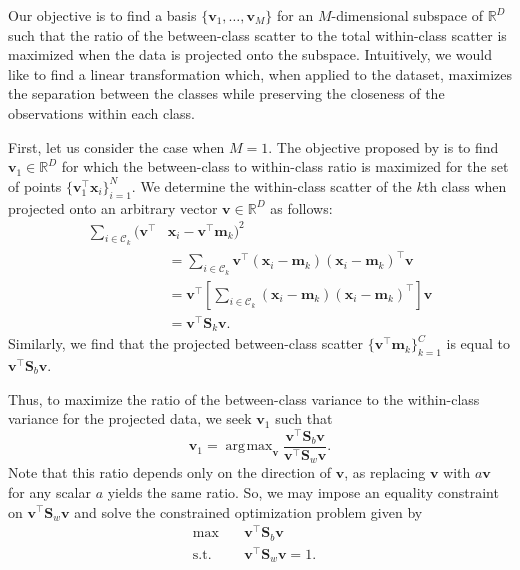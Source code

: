 \documentclass[letterpaper, 10 pt, conference]{ieeeconf}  %
\DeclareMathOperator*{\argmax}{\arg\!\max}
\newcommand{\ve}[1]{\mathbf{#1}}
\begin{document}
Our objective is to find a basis $\{\ve{v}_1,\ldots,\ve{v}_M\}$ for an $M$-dimensional subspace of $\mathbb{R}^D$ such that the ratio of the between-class scatter to the total within-class scatter is maximized when the data is projected onto the subspace. Intuitively, we would like to find a linear transformation which, when applied to the dataset, maximizes the separation between the classes while preserving the closeness of the observations within each class.

First, let us consider the case when $M = 1$. The objective proposed by \citeauthor{fisher} is to find $\ve{v}_1 \in \mathbb{R}^D$ for which the between-class to within-class ratio is maximized for the set of points $\{\ve{v}_1^{\top}\ve{x}_i\}_{i=1}^N$. We determine the within-class scatter of the $k$th class when projected onto an arbitrary vector $\ve{v} \in \mathbb{R}^D$ as follows:
\begin{align*}
    \sum_{i \in \mathcal{C}_k} (\ve{v}^\top & \ve{x}_i - \ve{v}^\top \ve{m}_k)^2
    \\&= \sum_{i \in \mathcal{C}_k} \ve{v}^\top (\ve{x}_i - \ve{m}_k)(\ve{x}_i - \ve{m}_k)^\top \ve{v}
    \\&= \ve{v}^\top \left[\sum_{i \in \mathcal{C}_k} (\ve{x}_i - \ve{m}_k)(\ve{x}_i - \ve{m}_k)^\top\right] \ve{v}
    \\&= \ve{v}^\top \ve{S}_k \ve{v}.
\end{align*}
Similarly, we find that the projected between-class scatter $\{\ve{v}^{\top}\ve{m}_k\}_{k=1}^{C}$ is equal to $\ve{v}^{\top}\ve{S}_b\ve{v}$. 

Thus, to maximize the ratio of the between-class variance to the within-class variance for the projected data, we seek $\ve{v}_1$ such that
$$\ve{v}_1 = \argmax_{\ve{v}} \frac{\ve{v}^{\top}\ve{S}_b\ve{v}}{\ve{v}^{\top}\ve{S}_w \ve{v}}.$$
Note that this ratio depends only on the direction of $\ve{v}$, as replacing $\ve{v}$ with $a\ve{v}$ for any scalar $a$ yields the same ratio. So, we may impose an equality constraint on $\ve{v}^{\top}\ve{S}_w \ve{v}$ and solve the constrained optimization problem given by 
$$
\begin{array}{rcll}
\max &~& \ve{v}^{\top}\ve{S}_b\ve{v} & \\
\mathrm{s.t.} &~& \ve{v}^{\top}\ve{S}_w\ve{v} = 1.
\end{array}
$$
\end{document}
